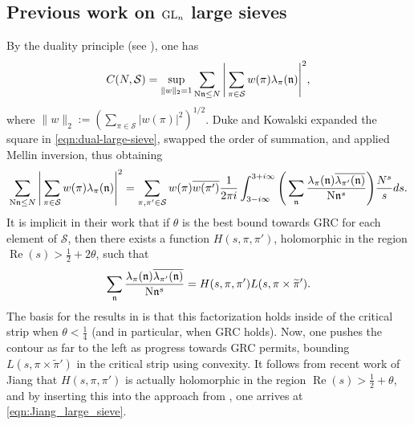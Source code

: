 \documentclass[11pt]{amsart}
\theoremstyle{remark}
\numberwithin{equation}{section}
\newcommand{\n}{\mathfrak{n}}
\newcommand{\kn}{\mathfrak{n}}
\newcommand{\N}{\textnormal{N}}
\newcommand{\mS}{\mathcal{S}}
\renewcommand{\Re}{\textnormal{Re}}
\newcommand{\GL}{\textnormal{GL}}
\newcommand{\re}{\mathop{\mathrm{Re}}}
\renewcommand{\Re}{\mathop{\mathrm{Re}}}
\begin{document}
\subsection{Previous work on $\GL_n$ large sieves}
By the duality principle (see \cite[p. 170]{IK}), one has
\begin{equation}
\label{eqn:dual-large-sieve}
    C(N, \mS) = \sup_{\|w\|_2 = 1}\sum_{\N \n \le N} \Bigg| \sum_{\pi \in \mS} w(\pi) \lambda_\pi(\n) \Bigg|^2,
\end{equation}
where $\|w\|_2 := ( \sum_{\pi \in \mS} |w(\pi)|^2 )^{1/2}$.  Duke and Kowalski \cite[Section 4]{DK} expanded the square in \eqref{eqn:dual-large-sieve}, swapped the order of summation, and applied Mellin inversion, thus obtaining
\begin{equation}
\label{eqn:approximation}
\begin{aligned}
\sum_{\N \n \le N} \Bigg| \sum_{\pi \in \mS} w(\pi) \lambda_\pi(\n) \Bigg|^2
=
    \sum_{\pi, \pi' \in \mS} w(\pi) \overline{w(\pi')} \frac{1}{2\pi i}\int_{3-i\infty}^{3+i\infty}\Bigg(\sum_{\kn}\frac{\lambda_{\pi}(\kn)\overline{\lambda_{\pi'}(\kn)}}{\N\kn^s}\Bigg)\frac{N^s}{s}ds.
\end{aligned}
\end{equation}
It is implicit in their work that if $\theta$ is the best bound towards GRC for each element of $\mathcal{S}$, then there exists a function $H(s,\pi,\pi')$, holomorphic in the region $\re(s)>\tfrac{1}{2}+2\theta$, such that
\[
\sum_{\kn}\frac{\lambda_{\pi}(\kn)\overline{\lambda_{\pi'}(\kn)}}{\N\kn^s} = H(s,\pi,\pi')L(s,\pi\times\widetilde{\pi}').
\]
The basis for the results in \cite{DK} is that this factorization holds inside of the critical strip when $\theta<\tfrac{1}{4}$ (and in particular, when GRC holds).  Now, one pushes the contour as far to the left as progress towards GRC permits, bounding $L(s,\pi\times\widetilde{\pi}')$ in the critical strip using convexity.
It follows from recent work of Jiang \cite{Jiang} that $H(s, \pi, \pi')$ is actually holomorphic in the region $\Re(s) > \tfrac{1}{2}+\theta$, and by inserting this into the approach from \cite{DK}, one arrives at \eqref{eqn:Jiang_large_sieve}.
\end{document}
